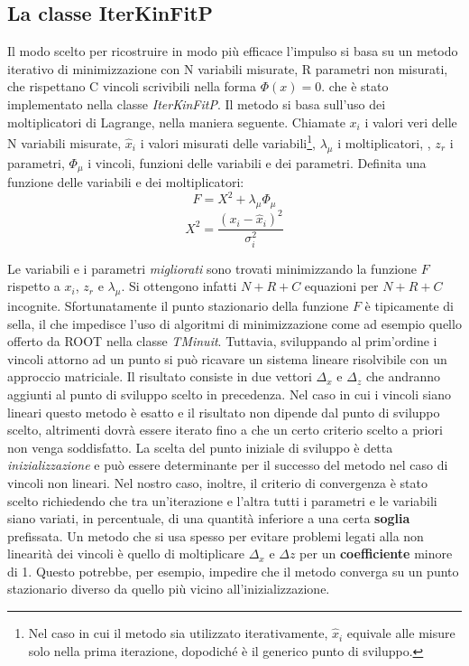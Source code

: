 \documentclass[8pt]{extarticle}
\begin{document}
\subsection{La classe IterKinFitP}
Il modo scelto per ricostruire in modo più efficace l'impulso si basa su un metodo iterativo di minimizzazione con N variabili misurate, R parametri non misurati, che rispettano C vincoli scrivibili nella forma $\Phi(x) = 0$. che è stato implementato nella classe \textit{IterKinFitP}. Il metodo si basa sull'uso dei moltiplicatori di Lagrange, nella maniera seguente. Chiamate $x_i$ i valori veri delle N variabili misurate, $\hat{x}_i$ i valori misurati delle variabili\footnote{Nel caso in cui il metodo sia utilizzato iterativamente, $\hat{x}_i$ equivale alle misure solo nella prima iterazione, dopodiché è il generico punto di sviluppo.}, $\lambda_\mu$ i moltiplicatori, , $z_r$ i parametri, $\Phi_\mu$ i vincoli, funzioni delle variabili e dei parametri. Definita una funzione delle variabili e dei moltiplicatori: \\
$$
F = X^2 + \lambda_\mu \Phi_\mu
$$
$$
X^2 = \frac{(x_i - \hat{x}_i)^2}{\sigma_i^2}
$$

Le variabili e i parametri \textit{migliorati} sono trovati minimizzando la funzione $F$ rispetto a $x_i$, $z_r$ e $\lambda_\mu$. Si ottengono infatti
$N+R+C$ equazioni per $N + R+ C$ incognite. Sfortunatamente il punto stazionario della funzione $F$ è tipicamente di sella, il che impedisce l'uso di algoritmi di minimizzazione come ad esempio quello offerto da ROOT nella classe \textit{TMinuit}. Tuttavia, sviluppando al prim'ordine i vincoli attorno ad un punto si può ricavare un sistema lineare risolvibile con un approccio matriciale. Il risultato consiste in due vettori $\Delta_x$ e $\Delta_z$ che andranno aggiunti al punto di sviluppo scelto in precedenza. Nel caso in cui i vincoli siano lineari questo metodo è esatto e il risultato non dipende dal punto di sviluppo scelto, altrimenti dovrà essere iterato fino a che un certo criterio scelto a priori non venga soddisfatto. La scelta del punto iniziale di sviluppo è detta \textit{inizializzazione} e può essere determinante per il successo del metodo nel caso di vincoli non lineari. Nel nostro caso, inoltre, il criterio di convergenza è stato scelto richiedendo che tra un'iterazione e l'altra tutti i parametri e le variabili siano variati, in percentuale, di una quantità inferiore a una certa \textbf{soglia} prefissata. Un metodo che si usa spesso per evitare problemi legati alla non linearità dei vincoli è quello di moltiplicare $\Delta_x$ e $\Delta z$ per un \textbf{coefficiente} minore di 1. Questo potrebbe, per esempio, impedire che il metodo converga su un punto stazionario diverso da quello più vicino all'inizializzazione. \\
\end{document}
